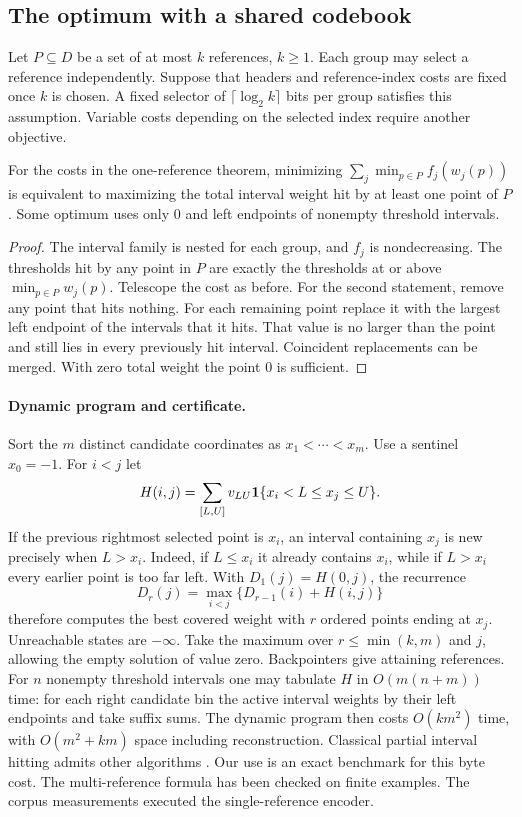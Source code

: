 \subsection{The optimum with a shared codebook}
Let $P\subseteq D$ be a set of at most $k$ references, $k\ge1$. Each group may select a reference independently. Suppose that headers and reference-index costs are fixed once $k$ is chosen. A fixed selector of $\lceil\log_2 k\rceil$ bits per group satisfies this assumption. Variable costs depending on the selected index require another objective.
\begin{theorem}\label{th:multiple}
For the costs in the one-reference theorem, minimizing
$\sum_j\min_{p\in P} f_j(w_j(p))$ is equivalent to maximizing the total interval weight hit by at least one point of $P$. Some optimum uses only $0$ and left endpoints of nonempty threshold intervals.
\end{theorem}
\begin{proof}
The interval family is nested for each group, and $f_j$ is nondecreasing. The thresholds hit by any point in $P$ are exactly the thresholds at or above $\min_{p\in P}w_j(p)$. Telescope the cost as before. For the second statement, remove any point that hits nothing. For each remaining point replace it with the largest left endpoint of the intervals that it hits. That value is no larger than the point and still lies in every previously hit interval. Coincident replacements can be merged. With zero total weight the point $0$ is sufficient.
\end{proof}

\paragraph{Dynamic program and certificate.} Sort the $m$ distinct candidate coordinates as $x_1<\cdots<x_m$. Use a sentinel $x_0=-1$. For $i<j$ let
\[
 H(i,j)=\sum_{[L,U]}v_{LU}\mathbf 1\{x_i<L\le x_j\le U\}.
\]
If the previous rightmost selected point is $x_i$, an interval containing $x_j$ is new precisely when $L>x_i$. Indeed, if $L\le x_i$ it already contains $x_i$, while if $L>x_i$ every earlier point is too far left. With $D_1(j)=H(0,j)$, the recurrence
\[
 D_r(j)=\max_{i<j}\{D_{r-1}(i)+H(i,j)\}
\]
therefore computes the best covered weight with $r$ ordered points ending at $x_j$. Unreachable states are $-\infty$. Take the maximum over $r\le\min(k,m)$ and $j$, allowing the empty solution of value zero. Backpointers give attaining references. For $n$ nonempty threshold intervals one may tabulate $H$ in $O(m(n+m))$ time: for each right candidate bin the active interval weights by their left endpoints and take suffix sums. The dynamic program then costs $O(km^2)$ time, with $O(m^2+km)$ space including reconstruction. Classical partial interval hitting admits other algorithms \cite{hitting}. Our use is an exact benchmark for this byte cost. The multi-reference formula has been checked on finite examples. The corpus measurements executed the single-reference encoder.

